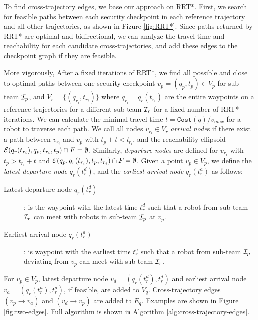 \documentclass[journal]{IEEEtran}  %
\begin{document}
To find cross-trajectory edges, we base our approach on RRT*. First, we search for feasible paths between each security checkpoint in each reference trajectory and all other trajectories, as shown in Figure \ref{fig:RRT*}. Since paths returned by RRT* are optimal and bidirectional, we can analyze the travel time and reachability for each candidate cross-trajectories, and  add these edges to the checkpoint graph if they are feasible.

More vigorously, After a fixed iterations of RRT*, we find all possible and close to optimal paths between one security checkpoint $v_{p}=(q_{p},t_{p}) \in V_{p}$ for sub-team $\mathcal{I}_p$, and $V_{r} = \{ (q_{{r}_{i}}, t_{{r}_{i}}) \}$ where  $q_{{r}_{i}} = q_{r}(t_{{r}_{i}})$ are the entire waypoints on a reference trajectories for a different sub-team $\mathcal{I}_{r}$ for a fixed number of RRT* iterations. We can calculate the minimal travel time $t=\texttt{Cost}(q)/v_{max}$ for a robot to traverse each path. We call all nodes $v_{{r}_{i}} \in V_{r}$ \emph{arrival node}s if there exist a path between $v_{{r}_{i}}$ and $v_{p}$ with $t_{p}+t<t_{{r}_{i}}$, and the reachability ellipsoid $\mathcal{E}(q_{r}(t_{{r}_{i}}),q_{p},t_{{r}_{i}},t_{p}) \cap F = \emptyset$. Similarly, \emph{departure node}s are defined for $v_{{r}_{i}}$ with $t_{p}>t_{{r}_{i}}+t$ and $\mathcal{E}(q_{p}, q_{r}(t_{{r}_{i}}),t_{p}, t_{{r}_{i}}) \cap F = \emptyset$. Given a point $v_{p} \in V_{p}$, we define the \emph{latest departure node} $q_{r}(t^{d}_r)$, and the \emph{earliest arrival node} $q_{r}(t^{a}_r)$ as follows:

\begin{description}
\item[Latest departure node $q_{r}(t^{d}_r)$]: is the waypoint with the latest time $t^{d}_r$ such that a robot from sub-team $\mathcal{I}_r$  can meet with robots in sub-team $\mathcal{I}_p$ at $v_{p}$.
\item[Earliest arrival node $q_{r}(t^{a}_r)$]: is waypoint with the earliest time $t^{a}_r$ such that a robot from sub-team $\mathcal{I}_p$ deviating from $v_{p}$ can meet with sub-team $\mathcal{I}_r$.
\end{description}

For $v_{p} \in V_{p}$, latest departure node $v_{d}=(q_{r}(t^{d}_r),t^{d}_r)$ and earliest arrival node $v_{a}= (q_{r}(t^{a}_r),t^{a}_r)$, if feasible, are added to $V_{q}$. Cross-trajectory edges $(v_{p} \to v_{a})$ and $(v_{d} \to v_{p})$ are added to $E_{q}$. Examples are shown in Figure \ref{fig:two-edges}. Full algorithm is shown in Algorithm \ref{alg:cross-trajectory-edges}.
\end{document}
